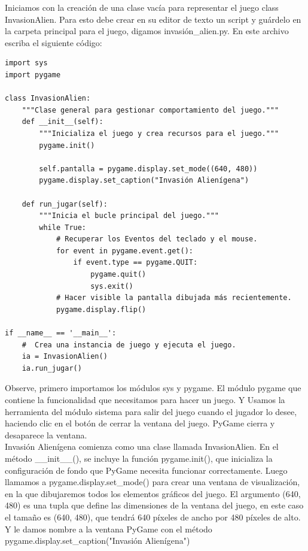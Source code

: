 {Iniciamos con la creación de una clase vacía para representar el juego  {\ttfamily class InvasionAlien}. Para esto debe crear en  su editor de texto un script y guárdelo en la carpeta principal para el juego, digamos {\ttfamily invasión\_alien.py}. En este archivo escriba el siguiente código:

\hspace{-2.9cm}{\ttfamily \scriptsize invasión}

\vspace{-0.2cm}
\hspace{-2.5cm}{\ttfamily \scriptsize \_alien.py}\vspace{-0.84cm}
\begin{lstlisting}
import sys
import pygame

class InvasionAlien:
    """Clase general para gestionar comportamiento del juego."""
    def __init__(self):
        """Inicializa el juego y crea recursos para el juego."""
        pygame.init()
	
        self.pantalla = pygame.display.set_mode((640, 480))
        pygame.display.set_caption("Invasión Alienígena")

    def run_jugar(self):
        """Inicia el bucle principal del juego."""
        while True:
            # Recuperar los Eventos del teclado y el mouse.
            for event in pygame.event.get():
                if event.type == pygame.QUIT:
                    pygame.quit()                    
                    sys.exit()
            # Hacer visible la pantalla dibujada más recientemente.
            pygame.display.flip()
            
if __name__ == '__main__':
    #  Crea una instancia de juego y ejecuta el juego.
    ia = InvasionAlien()
    ia.run_jugar()
\end{lstlisting}

Observe, primero importamos los módulos {\ttfamily sys} y {\ttfamily pygame}. El módulo  {\ttfamily pygame} que contiene la funcionalidad que necesitamos para hacer un juego.  Y Usamos la herramienta del módulo sistema para salir del juego cuando el jugador lo desee, haciendo clic en el botón de cerrar la ventana del juego. PyGame cierra y desaparece la ventana. \\

Invasión Alienígena comienza como una clase llamada {\ttfamily InvasionAlien}. En el método {\ttfamily\_\_init\_\_()}, se incluye 
la función {\ttfamily  pygame.init()}, que inicializa la configuración de fondo que PyGame necesita funcionar correctamente.
Luego llamamos a  {\ttfamily pygame.display.set\_mode()} para crear una ventana de visualización,    
en la que dibujaremos todos los  elementos gráficos del juego. El argumento (640, 480) es una tupla que define las 
dimensiones  de la ventana del juego, en este caso el tamaño es (640, 480), que tendrá 640 píxeles de ancho por 480 píxeles de alto. Y le damos nombre a la ventana PyGame con el método  {\ttfamily pygame.display.set\_caption("{}Invasión Alienígena"{})} \\
 

}

